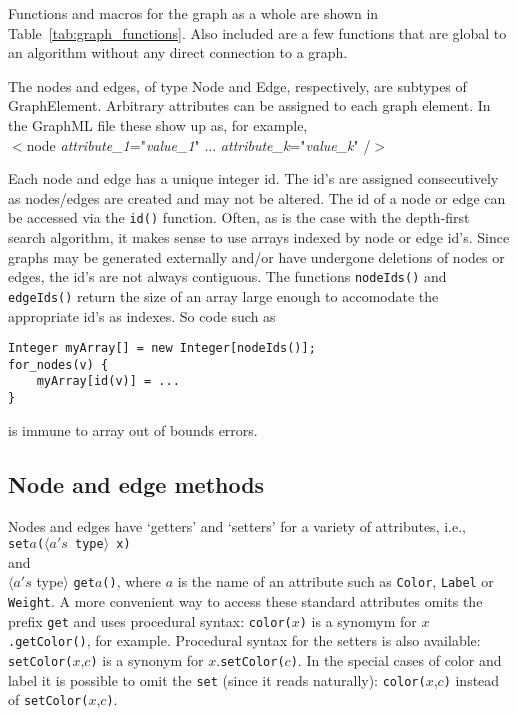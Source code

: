 

Functions and macros for the graph as a whole are shown in Table~\ref{tab:graph_functions}.
Also included are a few functions that are global to an algorithm without
any direct connection to a graph.

The nodes and edges, of type \textsf{Node} and \textsf{Edge}, respectively,
are subtypes of \textsf{GraphElement}.
Arbitrary attributes can be assigned to each graph element. In the GraphML file
these show up as, for example,\\
\hspace*{3em}
\textsf{
$<$node \emph{attribute\_1}="\emph{value\_1}" ... \emph{attribute\_k}="\emph{value\_k}" /$>$
}

Each node and edge has a unique integer id.
The id's are assigned consecutively as nodes/edges are created
and may not be altered.
The id of a node or edge can be accessed via the \texttt{id()} function.
Often, as is the case with the depth-first search algorithm, it makes sense to use
arrays indexed by node or edge id's.
Since graphs may be generated externally and/or have undergone deletions of nodes or
edges, the id's are not always contiguous.
The functions \texttt{nodeIds()} and \texttt{edgeIds()} return the size of an array
large enough to accomodate the appropriate id's as indexes. So code such as
\begin{verbatim}
Integer myArray[] = new Integer[nodeIds()];
for_nodes(v) {
    myArray[id(v)] = ...
}
\end{verbatim}
is immune to array out of bounds errors.

\subsection{Node and edge methods}

Nodes and edges have `getters' and `setters' for
a variety of attributes, i.e.,
\\
\texttt{set}$a$\texttt{($\langle a's$ type$\rangle$ x)}
\\
and
\\
$\langle a's$ type$\rangle$ \texttt{get}$a$\texttt{()},
where $a$ is the name of an attribute such as
\texttt{Color},
\texttt{Label} or \texttt{Weight}.
A more convenient way to access these standard attributes omits the prefix \texttt{get}
and uses procedural syntax:
\texttt{color(}$x$\texttt{)} is a synomym for $x$\texttt{.getColor()}, for example.
Procedural syntax for the setters is also available:
\texttt{setColor(}$x$,$c$\texttt{)} is a synonym for $x$.\texttt{setColor(}$c$\texttt{)}.
In the special cases of color and label it is possible to omit the \texttt{set}
(since it reads naturally): \texttt{color(}$x$,$c$\texttt{)} instead of \texttt{setColor(}$x$,$c$\texttt{)}.

